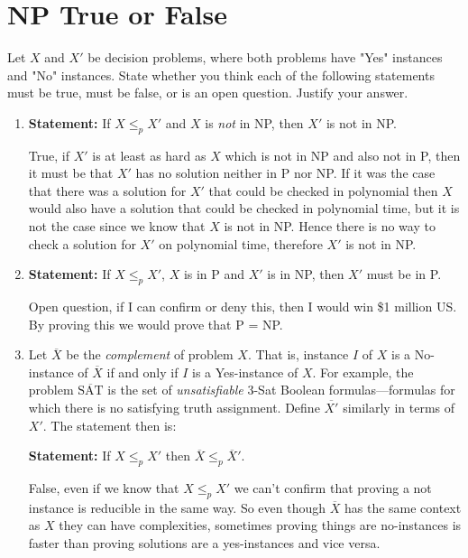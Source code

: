 \documentclass[11pt]{article}
\def\question#1{\red{#1}}
\def\soln#1{\par\blu{#1}} %
\def\blu#1{{\color{blu}#1}}
\def\red#1{{\color{red}#1}}
\begin{document}
\section{NP True or False}
\label{sec-2}
Let $X$ and $X'$ be decision problems, where both problems
have "Yes" instances and "No" instances.
\question{State whether you think each of the following statements must be true,
must be false, or is an open question. Justify your answer.}


\begin{enumerate}
\item \textbf{Statement:}
   If $X \le_p X'$ and $X$ is \emph{not} in NP, then $X'$ is not in NP.
\soln{
   True, if $X'$ is at least as hard as $X$ which is not in NP and also not in P, then it must be that 
   $X'$ has no solution neither in P nor NP. If it was the case that there was a solution for 
   $X'$ that could be checked in polynomial then $X$ would also have a solution that could be checked 
   in polynomial time, but it is not the case since we know that $X$ is not in NP. Hence there is no 
   way to check a solution for $X'$ on polynomial time, therefore $X'$ is not in NP.
}
\item \textbf{Statement:}
If $X \le_p X'$, $X$ is in P and $X'$ is in NP, then $X'$ must be in P.
\soln{
   Open question, if I can confirm or deny this, then I would win \$1 million US. By proving this 
   we would prove that P = NP.
}

\item Let
$\overline{X}$ be the \emph{complement} of problem $X$. That is,
instance $I$ of $X$ is a No-instance of $\overline{X}$ if and only
if $I$ is a Yes-instance of $X$. 
For example, the problem $\overline{\mbox{SAT}}$
is the set of \emph{unsatisfiable} 3-Sat Boolean formulas---formulas
for which there is no satisfying truth assignment.
Define $\overline{X'}$ similarly in terms of $X'$. The statement then is:

\textbf{Statement:} If $X \le_p X'$ then $\overline{X} \le_p \overline{X}'$.
\soln{
   False, even if we know that $X \le_p X'$ we can't confirm that proving a not instance is reducible 
   in the same way. So even though $\overline{X}$  has the same context as $X$ they can have complexities, 
   sometimes proving things are no-instances is faster than proving solutions are a yes-instances and 
   vice versa.
}
\end{enumerate}
\end{document}

